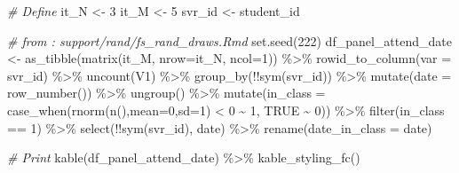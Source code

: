 \documentclass[
]{book}
\newenvironment{Shaded}{\begin{snugshade}}{\end{snugshade}}
\newcommand{\AttributeTok}[1]{\textcolor[rgb]{0.77,0.63,0.00}{#1}}
\newcommand{\CommentTok}[1]{\textcolor[rgb]{0.56,0.35,0.01}{\textit{#1}}}
\newcommand{\ConstantTok}[1]{\textcolor[rgb]{0.00,0.00,0.00}{#1}}
\newcommand{\DecValTok}[1]{\textcolor[rgb]{0.00,0.00,0.81}{#1}}
\newcommand{\FunctionTok}[1]{\textcolor[rgb]{0.00,0.00,0.00}{#1}}
\newcommand{\NormalTok}[1]{#1}
\newcommand{\OtherTok}[1]{\textcolor[rgb]{0.56,0.35,0.01}{#1}}
\newcommand{\SpecialCharTok}[1]{\textcolor[rgb]{0.00,0.00,0.00}{#1}}
\newcommand{\StringTok}[1]{\textcolor[rgb]{0.31,0.60,0.02}{#1}}
\begin{document}
\begin{Shaded}
\begin{Highlighting}[]
\CommentTok{\# Define}
\NormalTok{it\_N }\OtherTok{\textless{}{-}} \DecValTok{3}
\NormalTok{it\_M }\OtherTok{\textless{}{-}} \DecValTok{5}
\NormalTok{svr\_id }\OtherTok{\textless{}{-}} \StringTok{\textquotesingle{}student\_id\textquotesingle{}}

\CommentTok{\# from : support/rand/fs\_rand\_draws.Rmd}
\FunctionTok{set.seed}\NormalTok{(}\DecValTok{222}\NormalTok{)}
\NormalTok{df\_panel\_attend\_date }\OtherTok{\textless{}{-}} \FunctionTok{as\_tibble}\NormalTok{(}\FunctionTok{matrix}\NormalTok{(it\_M, }\AttributeTok{nrow=}\NormalTok{it\_N, }\AttributeTok{ncol=}\DecValTok{1}\NormalTok{)) }\SpecialCharTok{\%\textgreater{}\%}
  \FunctionTok{rowid\_to\_column}\NormalTok{(}\AttributeTok{var =}\NormalTok{ svr\_id) }\SpecialCharTok{\%\textgreater{}\%}
  \FunctionTok{uncount}\NormalTok{(V1) }\SpecialCharTok{\%\textgreater{}\%}
  \FunctionTok{group\_by}\NormalTok{(}\SpecialCharTok{!!}\FunctionTok{sym}\NormalTok{(svr\_id)) }\SpecialCharTok{\%\textgreater{}\%} \FunctionTok{mutate}\NormalTok{(}\AttributeTok{date =} \FunctionTok{row\_number}\NormalTok{()) }\SpecialCharTok{\%\textgreater{}\%}
  \FunctionTok{ungroup}\NormalTok{() }\SpecialCharTok{\%\textgreater{}\%} \FunctionTok{mutate}\NormalTok{(}\AttributeTok{in\_class =} \FunctionTok{case\_when}\NormalTok{(}\FunctionTok{rnorm}\NormalTok{(}\FunctionTok{n}\NormalTok{(),}\AttributeTok{mean=}\DecValTok{0}\NormalTok{,}\AttributeTok{sd=}\DecValTok{1}\NormalTok{) }\SpecialCharTok{\textless{}} \DecValTok{0} \SpecialCharTok{\textasciitilde{}} \DecValTok{1}\NormalTok{, }\ConstantTok{TRUE} \SpecialCharTok{\textasciitilde{}} \DecValTok{0}\NormalTok{)) }\SpecialCharTok{\%\textgreater{}\%}
  \FunctionTok{filter}\NormalTok{(in\_class }\SpecialCharTok{==} \DecValTok{1}\NormalTok{) }\SpecialCharTok{\%\textgreater{}\%} \FunctionTok{select}\NormalTok{(}\SpecialCharTok{!!}\FunctionTok{sym}\NormalTok{(svr\_id), date) }\SpecialCharTok{\%\textgreater{}\%}
  \FunctionTok{rename}\NormalTok{(}\AttributeTok{date\_in\_class =}\NormalTok{ date)}

\CommentTok{\# Print}
\FunctionTok{kable}\NormalTok{(df\_panel\_attend\_date) }\SpecialCharTok{\%\textgreater{}\%}
  \FunctionTok{kable\_styling\_fc}\NormalTok{()}
\end{Highlighting}
\end{Shaded}
\end{document}

